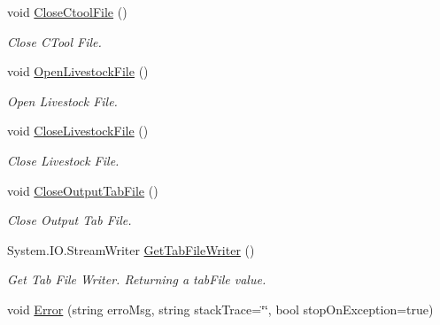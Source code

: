 \begin{DoxyCompactItemize}
\mbox{\label{class_global_vars_a11a63936e576b275d962584c5d415147}} 
void \mbox{\hyperlink{class_global_vars_a11a63936e576b275d962584c5d415147}{Close\+Ctool\+File}} ()
\begin{DoxyCompactList}\small\item\em Close C\+Tool File. \end{DoxyCompactList}\item 
\mbox{\label{class_global_vars_a67d8101f65e6a06b48e4ee6f98648bc1}} 
void \mbox{\hyperlink{class_global_vars_a67d8101f65e6a06b48e4ee6f98648bc1}{Open\+Livestock\+File}} ()
\begin{DoxyCompactList}\small\item\em Open Livestock File. \end{DoxyCompactList}\item 
\mbox{\label{class_global_vars_a47f3bf61f5820b930434a3f79ab6347a}} 
void \mbox{\hyperlink{class_global_vars_a47f3bf61f5820b930434a3f79ab6347a}{Close\+Livestock\+File}} ()
\begin{DoxyCompactList}\small\item\em Close Livestock File. \end{DoxyCompactList}\item 
\mbox{\label{class_global_vars_a882bf1b637aa2839079ca14e90c50af8}} 
void \mbox{\hyperlink{class_global_vars_a882bf1b637aa2839079ca14e90c50af8}{Close\+Output\+Tab\+File}} ()
\begin{DoxyCompactList}\small\item\em Close Output Tab File. \end{DoxyCompactList}\item 
System.\+I\+O.\+Stream\+Writer \mbox{\hyperlink{class_global_vars_ae46e7193670046608e26f2342ce6287d}{Get\+Tab\+File\+Writer}} ()
\begin{DoxyCompactList}\small\item\em Get Tab File Writer. Returning a tab\+File value. \end{DoxyCompactList}\item 
void \mbox{\hyperlink{class_global_vars_a2a6f1b6e75e0925726a16d292525841e}{Error}} (string erro\+Msg, string stack\+Trace=\char`\"{}\char`\"{}, bool stop\+On\+Exception=true)
\item 
\mbox{\label{class_global_vars_ac5574c4c8e6b42592e74966bd08e5b9f}} 

\end{DoxyCompactItemize}
